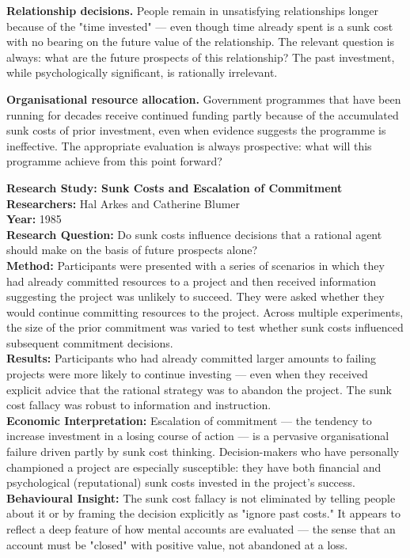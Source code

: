 \documentclass[12pt, letterpaper]{article}
\begin{document}
\textbf{Relationship decisions.} People remain in unsatisfying relationships longer because of the "time invested" --- even though time already spent is a sunk cost with no bearing on the future value of the relationship. The relevant question is always: what are the future prospects of this relationship? The past investment, while psychologically significant, is rationally irrelevant.

\textbf{Organisational resource allocation.} Government programmes that have been running for decades receive continued funding partly because of the accumulated sunk costs of prior investment, even when evidence suggests the programme is ineffective. The appropriate evaluation is always prospective: what will this programme achieve from this point forward?

\begin{researchbox}
\textbf{Research Study: Sunk Costs and Escalation of Commitment}\\[4pt]

\textbf{Researchers:} Hal Arkes and Catherine Blumer\\[4pt]
\textbf{Year:} 1985\\[4pt]
\textbf{Research Question:} Do sunk costs influence decisions that a rational agent should make on the basis of future prospects alone?\\[4pt]
\textbf{Method:} Participants were presented with a series of scenarios in which they had already committed resources to a project and then received information suggesting the project was unlikely to succeed. They were asked whether they would continue committing resources to the project. Across multiple experiments, the size of the prior commitment was varied to test whether sunk costs influenced subsequent commitment decisions.\\[4pt]
\textbf{Results:} Participants who had already committed larger amounts to failing projects were more likely to continue investing --- even when they received explicit advice that the rational strategy was to abandon the project. The sunk cost fallacy was robust to information and instruction.\\[4pt]
\textbf{Economic Interpretation:} Escalation of commitment --- the tendency to increase investment in a losing course of action --- is a pervasive organisational failure driven partly by sunk cost thinking. Decision-makers who have personally championed a project are especially susceptible: they have both financial and psychological (reputational) sunk costs invested in the project's success.\\[4pt]
\textbf{Behavioural Insight:} The sunk cost fallacy is not eliminated by telling people about it or by framing the decision explicitly as "ignore past costs." It appears to reflect a deep feature of how mental accounts are evaluated --- the sense that an account must be "closed" with positive value, not abandoned at a loss.\\[4pt]
\end{researchbox}
\end{document}
